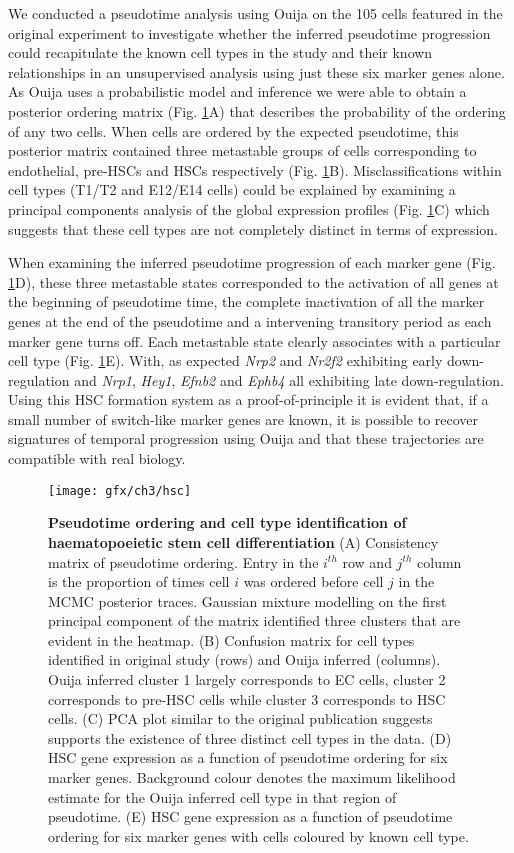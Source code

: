 We conducted a pseudotime analysis using Ouija on the 105 cells featured in the original experiment to investigate whether the inferred pseudotime progression could recapitulate the known cell types in the study and their known relationships in an unsupervised analysis using just these six marker genes alone. As Ouija uses a probabilistic model and inference we were able to obtain a posterior ordering matrix (Fig. \ref{fig:hsc}A) that describes the probability of the ordering of any two cells. When cells are ordered by the expected pseudotime, this posterior matrix contained three metastable groups of cells corresponding to endothelial, pre-HSCs and HSCs respectively (Fig. \ref{fig:hsc}B). Misclassifications within cell types (T1/T2 and E12/E14 cells) could be explained by examining a principal components analysis of the global expression profiles (Fig. \ref{fig:hsc}C) which suggests that these cell types are not completely distinct in terms of expression.

When examining the inferred pseudotime progression of each marker gene (Fig. \ref{fig:hsc}D), these three metastable states corresponded to the activation of all genes at the beginning of pseudotime time, the complete inactivation of all the marker genes at the end of the pseudotime and a intervening transitory period as each marker gene turns off. Each metastable state clearly associates with a particular cell type (Fig. \ref{fig:hsc}E). With, as expected \emph{Nrp2} and \emph{Nr2f2} exhibiting early down-regulation and \emph{Nrp1}, \emph{Hey1}, \emph{Efnb2} and \emph{Ephb4} all exhibiting late down-regulation. Using this HSC formation system as a proof-of-principle it is evident that, if a small number of switch-like marker genes are known, it is possible to recover signatures of temporal progression using Ouija and that these trajectories are compatible with real biology.

\begin{figure}[!t]
	\centering
	\texttt{[image: gfx/ch3/hsc]}
	\caption{{\bf Pseudotime ordering and cell type identification of haematopoeietic stem cell differentiation}
(A) Consistency matrix of pseudotime ordering. Entry in the $i^{th}$ row and $j^{th}$ column is the proportion of times cell $i$ was ordered before cell $j$ in the MCMC posterior traces. Gaussian mixture modelling on the first principal component of the matrix identified three clusters that are evident in the heatmap.
(B) Confusion matrix for cell types identified in original study (rows) and Ouija inferred (columns). Ouija inferred cluster 1 largely corresponds to EC cells, cluster 2 corresponds to pre-HSC cells while cluster 3 corresponds to HSC cells.
(C) PCA plot similar to the original publication \cite{zhou2016tracing} suggests supports the existence of three distinct cell types in the data.
(D) HSC gene expression as a function of pseudotime ordering for six marker genes. Background colour denotes the maximum likelihood estimate for the Ouija inferred cell type in that region of pseudotime.
(E) HSC gene expression as a function of pseudotime ordering for six marker genes with cells coloured by known cell type.
}
	\label{fig:hsc}
\end{figure}


